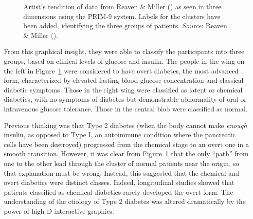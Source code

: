\documentclass[
  letterpaper,
  10pt,
  krantz2]{krantz}
\begin{document}
\begin{figure}


\caption{\label{fig-ReavenMiller-3d}Artist's rendition of data from
Reaven \& Miller () as seen in three
dimensions using the PRIM-9 system. Labels for the clusters have been
added, identifying the three groups of patients. \emph{Source}: Reaven
\& Miller ().}

\end{figure}%

From this graphical insight, they were able to classify the participants
into three groups, based on clinical levels of glucose and insulin. The
people in the wing on the left in Figure~\ref{fig-ReavenMiller-3d} were
considered to have overt diabetes, the most advanced form, characterized
by elevated fasting blood glucose concentration and classical diabetic
symptoms. Those in the right wing were classified as latent or chemical
diabetics, with no symptoms of diabetes but demonstrable abnormality of
oral or intravenous glucose tolerance. Those in the central blob were
classified as normal.

Previous thinking was that Type 2 diabetes (when the body cannot make
\emph{enough} insulin, as opposed to Type I, an autoimmune condition
where the pancreatic cells have been destroyed) progressed from the
chemical stage to an overt one in a smooth transition. However, it was
clear from Figure~\ref{fig-ReavenMiller-3d} that the only ``path'' from
one to the other lead through the cluster of normal patients near the
origin, so that explanation must be wrong. Instead, this suggested that
the chemical and overt diabetics were distinct classes. Indeed,
longitudinal studies showed that patients classified as chemical
diabetics rarely developed the overt form. The understanding of the
etiology of Type 2 diabetes was altered dramatically by the power of
high-D interactive graphics.
\end{document}
